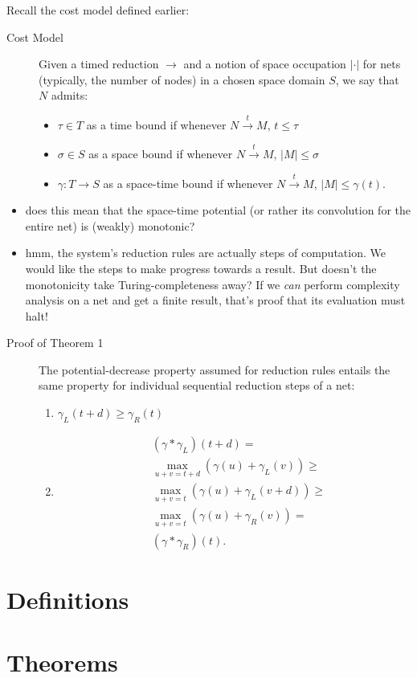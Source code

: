 \documentclass{fit-teorsem}
\begin{document}
\begin{itemize}
		Recall the cost model defined earlier:
		\begin{description}
			\item[Cost Model] Given a timed reduction $\longrightarrow$ and a notion of space
				occupation $|\cdot|$ for nets (typically, the number of nodes) in a chosen
				space domain $S$, we say that $N$ admits:
				\begin{itemize}
					\item $\tau \in T$ as a time bound if whenever
						$N \stackrel{t}{\longrightarrow} M$, $t \le \tau$
					\item $\sigma \in S$ as a space bound if whenever
						$N \stackrel{t}{\longrightarrow} M$, $|M| \le \sigma$
					\item $\gamma : T \to S$ as a space-time bound if whenever
						$N \stackrel{t}{\longrightarrow} M$, $|M| \le \gamma(t).$
				\end{itemize}
		\end{description}
		\begin{itemize}
			\item does this mean that the space-time potential (or rather its convolution for the entire net)
				is (weakly) monotonic?
			\item hmm, the system's reduction rules are actually steps of computation. We would like
				the steps to make progress towards a result. But doesn't the monotonicity take
				Turing-completeness away? If we \textit{can} perform complexity analysis on a net
				and get a finite result, that's proof that its evaluation must halt!
		\end{itemize}
		\begin{description}
			\item[Proof of Theorem 1] The potential-decrease property assumed for reduction rules
				entails the same property for individual sequential reduction steps of a net:
				\begin{enumerate}
					\item $\gamma_L (t + d) \ge \gamma_R (t)$
					\item \begin{align*}
							& (\gamma \ast \gamma_L) (t + d) = \\
							& \max_{u + v = t + d} (\gamma(u) + \gamma_L(v)) \ge \\
							& \max_{u + v = t} (\gamma(u) + \gamma_L(v + d)) \ge \\
							& \max_{u + v = t} (\gamma(u) + \gamma_R(v)) = \\
							& (\gamma \ast \gamma_R)(t)
						.\end{align*}
				\end{enumerate}
		\end{description}
\end{itemize}

\section*{Definitions}

\section*{Theorems}
\end{document}
